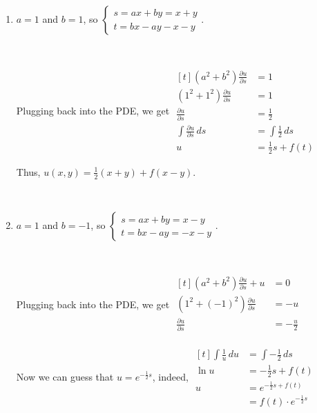 \begin{enumerate}
    {~~~}

    \item $a = 1$ and $b = 1$, so $\begin{cases}
        s = ax + by = x + y \\
        t = bx - ay - x - y
    \end{cases}$. 

    {~~~}

    Plugging back into the PDE, we get $\begin{aligned}[t]
        (a^2 + b^2) \frac{\partial u}{\partial s} & = 1                     \\
        (1^2 + 1^2) \frac{\partial u}{\partial s} & = 1                     \\
        \frac{\partial u}{\partial s}             & = \frac{1}{2}           \\
        \int \frac{\partial u}{\partial s} \,ds   & = \int \frac{1}{2} \,ds \\
        u                                         & = \frac{1}{2} s + f(t)
    \end{aligned}$

    Thus, $u(x, y) = \frac{1}{2}(x + y) + f(x - y)$. 

    {~~~}

    \item $a = 1$ and $b = -1$, so $\begin{cases}
        s = ax + by = x - y \\
        t = bx - ay = -x - y
    \end{cases}$. 

    {~~~}

    Plugging back into the PDE, we get $\begin{aligned}[t]
        (a^2 + b^2) \frac{\partial u}{\partial s} + u & = 0                            \\
        (1^2 + (-1)^2) \frac{\partial u}{\partial s}  & = -u                           \\
        \frac{\partial u}{\partial s}                 & = -\frac{u}{2}                 \\
    \end{aligned}$
    
    Now we can guess that $u=e^{-\frac{1}{2}s}$, indeed, 
    $\begin{aligned}[t]
        \int \frac{1}{u} \,du                         & = \int -\frac{1}{2} \,ds       \\
        \ln u                                         & = -\frac{1}{2}s + f(t)         \\
        u                                             & = e^{-\frac{1}{2}s + f(t)}     \\
                                                      & = f(t) \cdot e^{-\frac{1}{2}s}
    \end{aligned}$


\end{enumerate}
